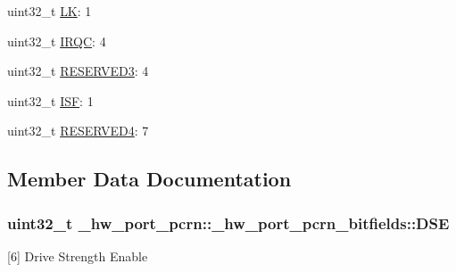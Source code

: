 \begin{DoxyCompactItemize}
uint32\+\_\+t \hyperlink{struct__hw__port__pcrn_1_1__hw__port__pcrn__bitfields_a1149dcdf28d0e399aabb0f98998eafc5}{LK}\+: 1
\item 
uint32\+\_\+t \hyperlink{struct__hw__port__pcrn_1_1__hw__port__pcrn__bitfields_a993847de4137f080768b5c2fabf349ee}{I\+R\+QC}\+: 4
\item 
uint32\+\_\+t \hyperlink{struct__hw__port__pcrn_1_1__hw__port__pcrn__bitfields_af43f5ee9f987ce4614bcdbbf11126e02}{R\+E\+S\+E\+R\+V\+E\+D3}\+: 4
\item 
uint32\+\_\+t \hyperlink{struct__hw__port__pcrn_1_1__hw__port__pcrn__bitfields_abea03031abb366ba4ae2fab3cb9e95d7}{I\+SF}\+: 1
\item 
uint32\+\_\+t \hyperlink{struct__hw__port__pcrn_1_1__hw__port__pcrn__bitfields_a26ef496f3dca87b3adaa21cc432f6aa3}{R\+E\+S\+E\+R\+V\+E\+D4}\+: 7
\end{DoxyCompactItemize}


\subsection{Member Data Documentation}
\subsubsection[{\texorpdfstring{D\+SE}{DSE}}]{\setlength{\rightskip}{0pt plus 5cm}uint32\+\_\+t \+\_\+hw\+\_\+port\+\_\+pcrn\+::\+\_\+hw\+\_\+port\+\_\+pcrn\+\_\+bitfields\+::\+D\+SE}\hypertarget{struct__hw__port__pcrn_1_1__hw__port__pcrn__bitfields_a51ea92d66de56d050ca7cc2f53d0d71e}{}\label{struct__hw__port__pcrn_1_1__hw__port__pcrn__bitfields_a51ea92d66de56d050ca7cc2f53d0d71e}
\mbox{[}6\mbox{]} Drive Strength Enable 
